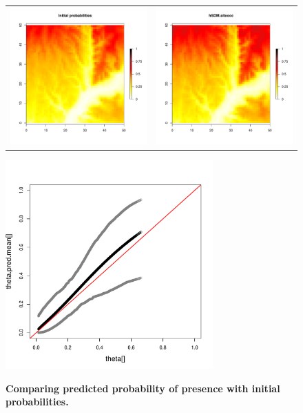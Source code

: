\documentclass[a4paper, 12pt, leqno]{article}\usepackage[]{graphicx}\usepackage[]{color}
\begin{document}
\begin{figure} 
  \begin{tabular}{cc}
    \includegraphics[width=8cm]{figures/theta-binomial.pdf} &
    \includegraphics[width=8cm]{figures/predictions-siteocc.pdf} \\
  \end{tabular}
  \centering \includegraphics[width=8cm]{figures/pred-obs-siteocc.pdf} \\
  
  \caption{\textbf{Comparing predicted probability of presence with initial
      probabilities.}}
  
  \label{fig:predictions-siteocc}
  
\end{figure}
\end{document}
